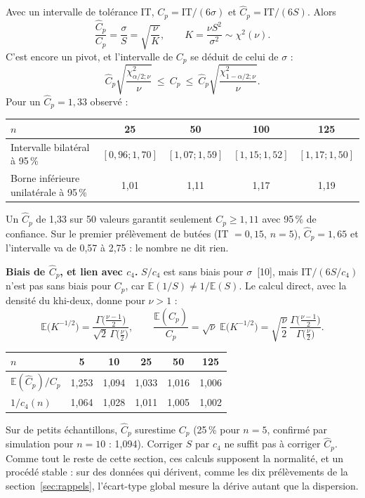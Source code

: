\documentclass[11pt,a4paper]{article}
\theoremstyle{sj}
\theoremstyle{definition}
\theoremstyle{remark}
\newcommand{\E}{\mathbb{E}}
\newcommand{\chid}{\chi^2}
\begin{document}
Avec un intervalle de tolérance IT, $C_p=\mathrm{IT}/(6\sigma)$ et $\hat C_p=\mathrm{IT}/(6S)$. Alors
\[
\frac{\hat C_p}{C_p}=\frac{\sigma}{S}=\sqrt{\frac{\nu}{K}},\qquad K=\frac{\nu S^2}{\sigma^2}\sim\chid(\nu).
\]
C'est encore un pivot, et l'intervalle de $C_p$ se déduit de celui de $\sigma$ :
\[
\hat C_p\sqrt{\frac{\chid_{\alpha/2;\nu}}{\nu}}\ \le\ C_p\ \le\ \hat C_p\sqrt{\frac{\chid_{1-\alpha/2;\nu}}{\nu}}.
\]
Pour un $\hat C_p=1{,}33$ observé :
\begin{center}
\small
\begin{tabular}{l c c c c}
\toprule
$n$ & 25 & 50 & 100 & 125\\
\midrule
Intervalle bilatéral à 95\,\% & $[0{,}96;1{,}70]$ & $[1{,}07;1{,}59]$ & $[1{,}15;1{,}52]$ & $[1{,}17;1{,}50]$\\
Borne inférieure unilatérale à 95\,\% & 1,01 & 1,11 & 1,17 & 1,19\\
\bottomrule
\end{tabular}
\end{center}
Un $\hat C_p$ de 1,33 sur 50 valeurs garantit seulement $C_p\ge1{,}11$ avec 95\,\% de confiance. Sur le premier prélèvement de butées (IT $=0{,}15$, $n=5$), $\hat C_p=1{,}65$ et l'intervalle va de 0,57 à 2,75 : le nombre ne dit rien.

\textbf{Biais de $\hat C_p$, et lien avec $c_4$.} $S/c_4$ est sans biais pour $\sigma$~[10], mais $\mathrm{IT}/(6S/c_4)$ n'est pas sans biais pour $C_p$, car $\E(1/S)\ne1/\E(S)$. Le calcul direct, avec la densité du khi-deux, donne pour $\nu>1$ :
\[
\E\big(K^{-1/2}\big)=\frac{\Gamma\big(\frac{\nu-1}{2}\big)}{\sqrt2\,\Gamma\big(\frac\nu2\big)},\qquad
\frac{\E(\hat C_p)}{C_p}=\sqrt\nu\;\E\big(K^{-1/2}\big)=\sqrt{\frac\nu2}\,\frac{\Gamma\big(\frac{\nu-1}{2}\big)}{\Gamma\big(\frac\nu2\big)}.
\]
\begin{center}
\small
\begin{tabular}{l c c c c c}
\toprule
$n$ & 5 & 10 & 25 & 50 & 125\\
\midrule
$\E(\hat C_p)/C_p$ & 1,253 & 1,094 & 1,033 & 1,016 & 1,006\\
$1/c_4(n)$ & 1,064 & 1,028 & 1,011 & 1,005 & 1,002\\
\bottomrule
\end{tabular}
\end{center}
Sur de petits échantillons, $\hat C_p$ surestime $C_p$ (25\,\% pour $n=5$, confirmé par simulation pour $n=10$ : 1,094). Corriger $S$ par $c_4$ ne suffit pas à corriger $\hat C_p$. Comme tout le reste de cette section, ces calculs supposent la normalité, et un procédé stable : sur des données qui dérivent, comme les dix prélèvements de la section~\ref{sec:rappels}, l'écart-type global mesure la dérive autant que la dispersion.
\end{document}
